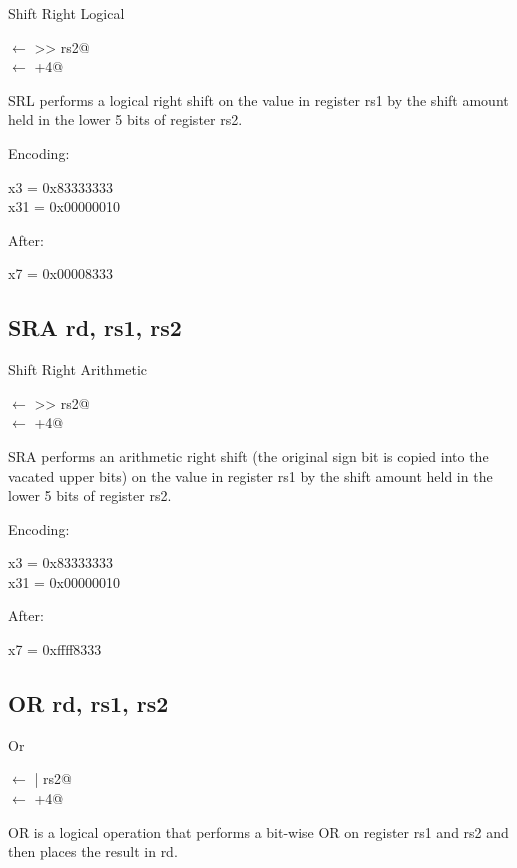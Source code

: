 Shift Right Logical

\verb@rd@ $\leftarrow$  >> rs2@\\
\verb@pc@ $\leftarrow$ \verb@pc+4@

SRL performs a logical right shift on the value in register rs1 by 
the shift amount held in the lower 5 bits of 
register rs2.~\cite[p.~15]{rvismv1v22:2017}

Encoding:


x3  = 0x83333333\\
x31 = 0x00000010

After:

x7 = 0x00008333

\subsection{SRA rd, rs1, rs2}

Shift Right Arithmetic

\verb@rd@ $\leftarrow$  >> rs2@\\
\verb@pc@ $\leftarrow$ \verb@pc+4@

SRA performs an arithmetic right shift (the original sign bit is copied 
into the vacated upper bits) on the value in register rs1 by the shift 
amount held in the lower 5 bits of 
register rs2.~\cite[p.~14,~15]{rvismv1v22:2017}

Encoding:


x3  = 0x83333333\\
x31 = 0x00000010

After:

x7 = 0xffff8333

\subsection{OR rd, rs1, rs2}

Or 

\verb@rd@ $\leftarrow$  | rs2@\\
\verb@pc@ $\leftarrow$ \verb@pc+4@

OR is a logical operation that performs a bit-wise OR on 
register rs1 and rs2 and then places the result 
in rd.~\cite[p.~14]{rvismv1v22:2017}

